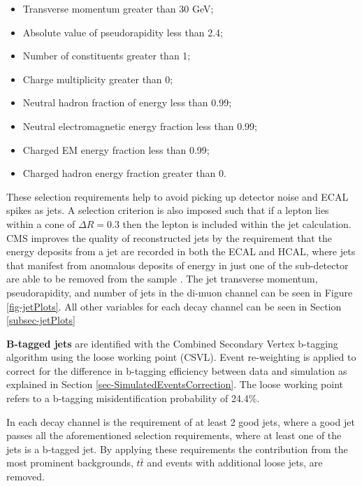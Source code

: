 \begin{itemize}
	\item Transverse momentum greater than 30 GeV;
	\item Absolute value of pseudorapidity less than 2.4;
	\item Number of constituents greater than 1;
	\item Charge multiplicity greater than 0;
	\item Neutral hadron fraction of energy less than 0.99;
	\item Neutral electromagnetic energy fraction less than 0.99;
	\item Charged EM energy fraction less than 0.99;
	\item Charged hadron energy fraction greater than 0.
\end{itemize}

These selection requirements help to avoid picking up detector noise and ECAL spikes as jets. A selection criterion is also imposed such that if a lepton lies within a cone of $\Delta R = 0.3$ then the lepton is included within the jet calculation. CMS improves the quality of reconstructed jets by the requirement that the energy deposits from a jet are recorded in both the ECAL and HCAL, where jets that manifest from anomalous deposits of energy in just one of the sub-detector are able to be removed from the sample \cite{CMS-PAS-JME-10-003}. The jet transverse momentum, pseudorapidity, and number of jets in the di-muon channel can be seen in Figure \ref{fig-jetPlots}. All other variables for each decay channel can be seen in Section \ref{subsec-jetPlots}

 \textbf{B-tagged jets} are identified with the Combined Secondary Vertex b-tagging algorithm using the loose working point (CSVL). Event re-weighting is applied to correct for the difference in b-tagging efficiency between data and simulation as explained in Section \ref{sec-SimulatedEventsCorrection}. The loose working point refers to a b-tagging misidentification probability of 24.4\%.

 In each decay channel is the requirement of at least 2 good jets, where a good jet passes all the aforementioned selection requirements, where at least one of the jets is a b-tagged jet. By applying these requirements the contribution from the most prominent backgrounds, $t\bar{t}$ and events with additional loose jets, are removed. 

